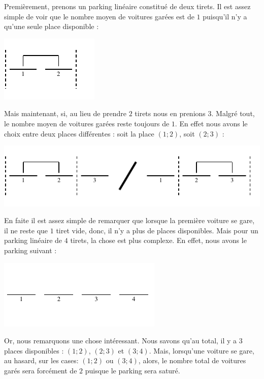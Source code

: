 \documentclass[a4paper,francais,11pt]{article}
\begin{document}
Premièrement, prenons un parking linéaire constitué de deux tirets. Il est assez simple de voir que le nombre moyen de voitures garées est de $1$ puisqu'il n'y a qu'une seule place disponible :
\begin{center}
\includegraphics{fig7.pdf}
\end{center}

Mais maintenant, si, au lieu de prendre $2$ tirets nous en prenions $3$. Malgré tout, le nombre moyen de voitures garées reste toujours de $1$. En effet nous avons le choix entre deux places différentes : soit la place $(1;2)$, soit $(2;3)$ :
\begin{center}
\includegraphics{fig8.pdf}
\end{center}

En faite il est assez simple de remarquer que lorsque la première voiture se gare, il ne reste que $1$ tiret vide, donc, il n'y a plus de places disponibles. Mais pour un parking linéaire de $4$ tirets, la chose est plus complexe. En effet, nous avons le parking suivant :
\begin{center}
\includegraphics{fig9.pdf}
\end{center}

Or, nous remarquons une chose intéressant. Nous savons qu'au total, il y a $3$ places disponibles : $(1;2)$, $(2;3)$ et $(3;4)$. Mais, lorsqu'une voiture se gare, au hasard, sur les cases: $(1;2)$ ou $(3;4)$, alors, le nombre total de voitures garés sera forcément de $2$ puisque le parking sera saturé. 
\end{document}
